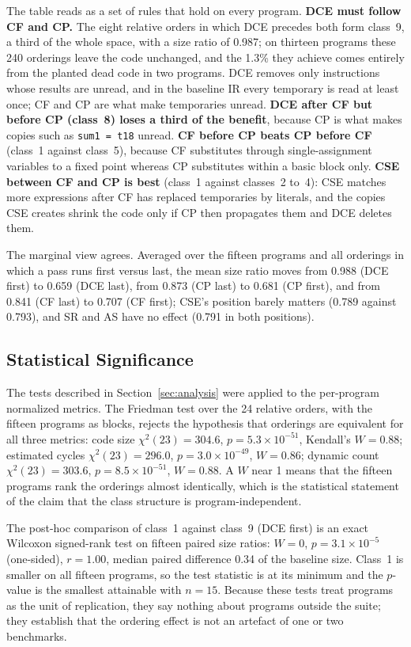 \documentclass[conference]{IEEEtran}
\begin{document}
The table reads as a set of rules that hold on every program. \textbf{DCE must follow CF and CP.} The eight relative orders in which DCE precedes both form class~9, a third of the whole space, with a size ratio of 0.987; on thirteen programs these 240 orderings leave the code unchanged, and the 1.3\% they achieve comes entirely from the planted dead code in two programs. DCE removes only instructions whose results are unread, and in the baseline IR every temporary is read at least once; CF and CP are what make temporaries unread. \textbf{DCE after CF but before CP (class~8) loses a third of the benefit}, because CP is what makes copies such as \texttt{sum1 = t18} unread. \textbf{CF before CP beats CP before CF} (class~1 against class~5), because CF substitutes through single-assignment variables to a fixed point whereas CP substitutes within a basic block only. \textbf{CSE between CF and CP is best} (class~1 against classes~2 to~4): CSE matches more expressions after CF has replaced temporaries by literals, and the copies CSE creates shrink the code only if CP then propagates them and DCE deletes them.

The marginal view agrees. Averaged over the fifteen programs and all orderings in which a pass runs first versus last, the mean size ratio moves from 0.988 (DCE first) to 0.659 (DCE last), from 0.873 (CP last) to 0.681 (CP first), and from 0.841 (CF last) to 0.707 (CF first); CSE's position barely matters (0.789 against 0.793), and SR and AS have no effect (0.791 in both positions).

\subsection{Statistical Significance}
\label{sec:stats}
The tests described in Section~\ref{sec:analysis} were applied to the per-program normalized metrics. The Friedman test over the 24 relative orders, with the fifteen programs as blocks, rejects the hypothesis that orderings are equivalent for all three metrics: code size $\chi^2(23) = 304.6$, $p = 5.3 \times 10^{-51}$, Kendall's $W = 0.88$; estimated cycles $\chi^2(23) = 296.0$, $p = 3.0 \times 10^{-49}$, $W = 0.86$; dynamic count $\chi^2(23) = 303.6$, $p = 8.5 \times 10^{-51}$, $W = 0.88$. A $W$ near 1 means that the fifteen programs rank the orderings almost identically, which is the statistical statement of the claim that the class structure is program-independent.

The post-hoc comparison of class~1 against class~9 (DCE first) is an exact Wilcoxon signed-rank test on fifteen paired size ratios: $W = 0$, $p = 3.1 \times 10^{-5}$ (one-sided), $r = 1.00$, median paired difference 0.34 of the baseline size. Class~1 is smaller on all fifteen programs, so the test statistic is at its minimum and the $p$-value is the smallest attainable with $n = 15$. Because these tests treat programs as the unit of replication, they say nothing about programs outside the suite; they establish that the ordering effect is not an artefact of one or two benchmarks.
\end{document}
